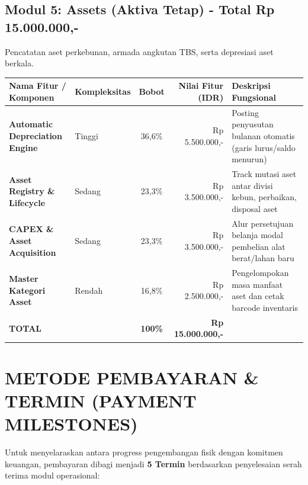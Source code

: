 \documentclass[11pt,a4paper]{article}
\begin{document}
\subsection{Modul 5: Assets (Aktiva Tetap) - Total Rp 15.000.000,-}
Pencatatan aset perkebunan, armada angkutan TBS, serta depresiasi aset berkala.

\begin{table}[h!]
\centering
\scriptsize
\begin{tabular}{llcrl}
    \toprule
    \textbf{Nama Fitur / Komponen} & \textbf{Kompleksitas} & \textbf{Bobot} & \textbf{Nilai Fitur (IDR)} & \textbf{Deskripsi Fungsional} \\
    \midrule
    \textbf{Automatic Depreciation Engine} & Tinggi & 36,6\% & Rp 5.500.000,- & Posting penyusutan bulanan otomatis (garis lurus/saldo menurun) \\
    \textbf{Asset Registry \& Lifecycle} & Sedang & 23,3\% & Rp 3.500.000,- & Track mutasi aset antar divisi kebun, perbaikan, disposal aset \\
    \textbf{CAPEX \& Asset Acquisition} & Sedang & 23,3\% & Rp 3.500.000,- & Alur persetujuan belanja modal pembelian alat berat/lahan baru \\
    \textbf{Master Kategori Asset} & Rendah & 16,8\% & Rp 2.500.000,- & Pengelompokan masa manfaat aset dan cetak barcode inventaris \\
    \midrule
    \textbf{TOTAL} & & \textbf{100\%} & \textbf{Rp 15.000.000,-} & \\
    \bottomrule
\end{tabular}
\end{table}

\newpage

\section{METODE PEMBAYARAN \& TERMIN (PAYMENT MILESTONES)}

Untuk menyelaraskan antara progress pengembangan fisik dengan komitmen keuangan, pembayaran dibagi menjadi \textbf{5 Termin} berdasarkan penyelesaian serah terima modul operasional:
\end{document}
